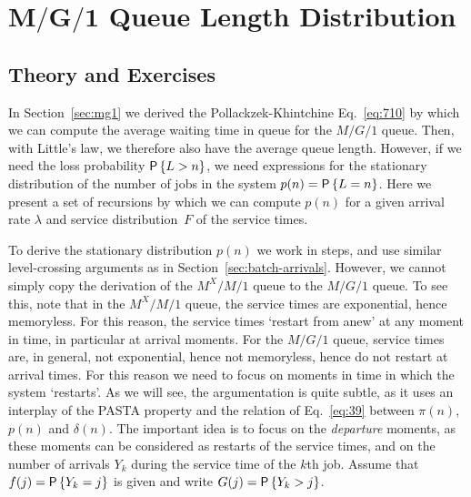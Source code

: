 \section
[$M/G/1$ Queue Length Distribution]
{$\mathbf{M/G/1}$ Queue Length Distribution}
\label{sec:distr-queue-length}


\subsection*{Theory and Exercises}
\label{sec:exercises}


In Section~\ref{sec:mg1} we derived the Pollackzek-Khintchine
Eq.~\eqref{eq:710} by which we can compute the average waiting time in
queue for the $M/G/1$ queue. Then, with Little's law, we therefore
also have the average queue length. However, if we need the loss
probability $\P{L>n}$, we need expressions for the stationary
distribution of the number of jobs in the system $p(n)=\P{L=n}$.  Here
we present a set of recursions by which we can compute $p(n)$ for
a given arrival rate $\lambda$ and service distribution~$F$ of the
service times. 

To derive the stationary distribution $p(n)$ we work in steps, and use
similar level-crossing arguments as in
Section~\ref{sec:batch-arrivals}.  However, we cannot simply copy the
derivation of the $M^X/M/1$ queue to the $M/G/1$ queue. To see this,
note that in the $M^X/M/1$ queue, the service times are exponential,
hence memoryless. For this reason, the service times `restart from
anew' at any moment in time, in particular at arrival moments. For the
$M/G/1$ queue, service times are, in general, not exponential, hence
not memoryless, hence do not restart at arrival times. For this reason
we need to focus on moments in time in which the system `restarts'. As
we will see, the argumentation is quite subtle, as it uses an
interplay of the PASTA property and the relation of Eq.~\eqref{eq:39}
between $\pi(n)$, $p(n)$ and $\delta(n)$. The important idea is to
focus on the \emph{departure} moments, as these moments can be
considered as restarts of the service times, and on the number of
arrivals $Y_k$ during the service time of the $k$th job.  Assume that
$f(j) = \P{Y_k = j}$ is given and write $G(j) = \P{Y_k > j}$.

